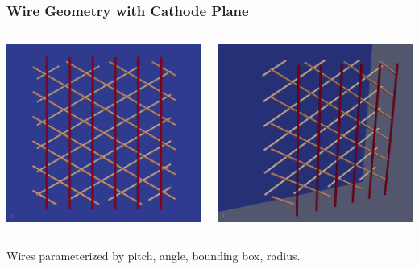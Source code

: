 \documentclass[xcolor=dvipsnames]{beamer}
\begin{document}
\begin{frame}
  \frametitle{Wire Geometry with Cathode Plane}
  \begin{columns}
    \begin{column}{0.5\textwidth}
      \begin{center}
        \includegraphics[width=\textwidth]{wires-flat.png}
      \end{center}
    \end{column}
    \begin{column}{0.5\textwidth}
      \begin{center}
        \includegraphics[width=\textwidth]{wires-iso.png}
      \end{center}
    \end{column}
  \end{columns}
  
  \begin{center}
    Wires parameterized by pitch, angle, bounding box, radius.
  \end{center}
\end{frame}
\end{document}
